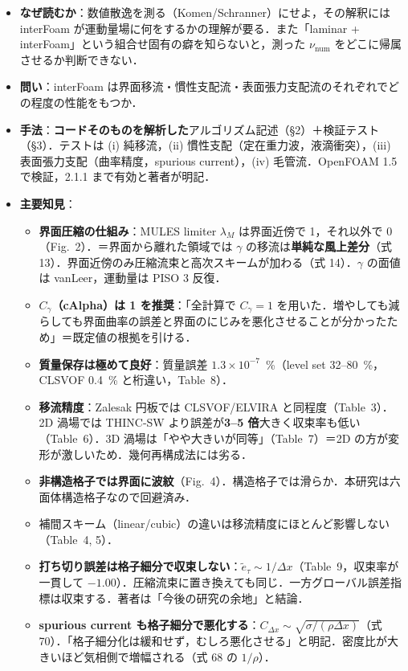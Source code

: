 \documentclass[11pt]{jsarticle}
\begin{document}
\begin{itemize}
  \item \textbf{なぜ読むか}：数値散逸を測る（Komen/Schranner）にせよ，その解釈には interFoam が運動量場に何をするかの理解が要る．また「laminar + interFoam」という組合せ固有の癖を知らないと，測った $\nu_\mathrm{num}$ をどこに帰属させるか判断できない．
  \item \textbf{問い}：interFoam は界面移流・慣性支配流・表面張力支配流のそれぞれでどの程度の性能をもつか．
  \item \textbf{手法}：\textbf{コードそのものを解析した}アルゴリズム記述（§2）＋検証テスト（§3）．テストは (i) 純移流，(ii) 慣性支配（定在重力波，液滴衝突），(iii) 表面張力支配（曲率精度，spurious current），(iv) 毛管流．OpenFOAM 1.5 で検証，2.1.1 まで有効と著者が明記．
  \item \textbf{主要知見}：
  \begin{itemize}
    \item \textbf{界面圧縮の仕組み}：MULES limiter $\lambda_M$ は界面近傍で 1，それ以外で 0（Fig.~2）．＝界面から離れた領域では $\gamma$ の移流は\textbf{単純な風上差分}（式 13）．界面近傍のみ圧縮流束と高次スキームが加わる（式 14）．$\gamma$ の面値は vanLeer，運動量は PISO 3 反復．
    \item \textbf{$C_\gamma$（cAlpha）は 1 を推奨}：「全計算で $C_\gamma = 1$ を用いた．増やしても減らしても界面曲率の誤差と界面のにじみを悪化させることが分かったため」＝既定値の根拠を引ける．
    \item \textbf{質量保存は極めて良好}：質量誤差 $1.3\times10^{-7}$~\%（level set 32--80~\%，CLSVOF 0.4~\% と桁違い，Table~8）．
    \item \textbf{移流精度}：Zalesak 円板では CLSVOF/ELVIRA と同程度（Table~3）．2D 渦場では THINC-SW より誤差が\textbf{3--5 倍}大きく収束率も低い（Table~6）．3D 渦場は「やや大きいが同等」（Table~7）＝2D の方が変形が激しいため．幾何再構成法には劣る．
    \item \textbf{非構造格子では界面に波紋}（Fig.~4）．構造格子では滑らか．本研究は六面体構造格子なので回避済み．
    \item 補間スキーム（linear/cubic）の違いは移流精度にほとんど影響しない（Table~4, 5）．
    \item \textbf{打ち切り誤差は格子細分で収束しない}：$\tilde{e}_\tau \sim 1/\Delta x$（Table~9，収束率が一貫して $-1.00$）．圧縮流束に置き換えても同じ．一方グローバル誤差指標は収束する．著者は「今後の研究の余地」と結論．
    \item \textbf{spurious current も格子細分で悪化する}：$C_{\Delta x} \sim \sqrt{\sigma/(\rho\Delta x)}$（式 70）．「格子細分化は緩和せず，むしろ悪化させる」と明記．密度比が大きいほど気相側で増幅される（式 68 の $1/\rho$）．

\end{itemize}
\end{itemize}
\end{document}
